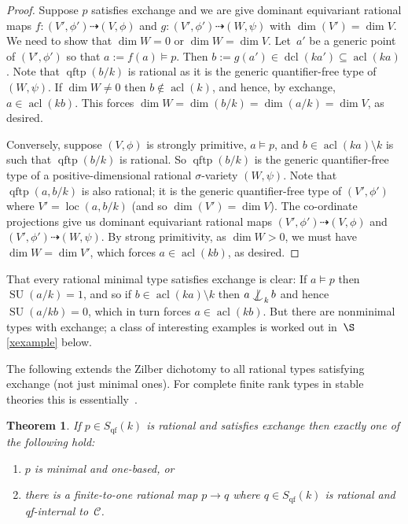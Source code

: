 \documentclass[\DocOpts]{amsart}
\newtheorem{theorem}{Theorem}[section]
\theoremstyle{definition}
\def\qftp{\operatorname{qftp}}
\def\qf{\operatorname{qf}}
\def\acl{\operatorname{acl}}
\def\dcl{\operatorname{dcl}}
\def\loc{\operatorname{loc}}
\def\su{\operatorname{SU}}
\def\C{\mathcal{C}}
\newcommand{\<}{\langle}
\renewcommand{\>}{\rangle}
\newcommand{\dto}{\dashrightarrow}
\def\notind#1#2{#1\setbox0=\hbox{\(#1x\)}\kern\wd0\hbox to 
0pt{\mathchardef\nn=12854\hss\(#1\nn\)\kern1.4\wd0\hss}\hbox to 
0pt{\hss\(#1\mid\)\hss}\lower.9\ht0 \hbox to 
0pt{\hss\(#1\smile\)\hss}\kern\wd0}
\def\nind{\mathop{\mathpalette\notind{}}}
\begin{document}
\begin{proof}
Suppose $p$ satisfies exchange and we are give dominant equivariant rational maps $f:(V',\phi')\dto (V,\phi)$ and $g:(V',\phi')\dto(W,\psi)$ with $\dim (V')=\dim V$.
We need to show that $\dim W=0$ or $\dim W=\dim V$.
Let~$a'$ be a generic point of $(V',\phi')$ so that $a:=f(a)\models p$.
Then $b:=g(a')\in\dcl(ka')\subseteq \acl(ka)$.
Note that $\qftp(b/k)$ is rational as it is the generic quantifier-free type of $(W,\psi)$.
If $\dim W\neq 0$ then $b\notin\acl(k)$, and hence, by exchange, $a\in\acl(kb)$.
This forces $\dim W=\dim(b/k)=\dim(a/k)=\dim V$, as desired.

Conversely, suppose $(V,\phi)$ is strongly primitive, $a\models p$, and $b\in\acl(ka)\setminus k$ is such that $\qftp(b/k)$ is rational.
So $\qftp(b/k)$ is the generic quantifier-free type of a positive-dimensional rational $\sigma$-variety $(W,\psi)$.
Note that $\qftp(a,b/k)$ is also rational; it is the generic quantifier-free type of $(V',\phi')$ where $V'=\loc(a,b/k)$ (and so $\dim(V')=\dim V$).
The co-ordinate projections give us dominant equivariant rational maps $(V',\phi')\dto (V,\phi)$ and $(V',\phi')\dto(W,\psi)$.
By strong primitivity, as $\dim W>0$, we must have $\dim W=\dim V'$, which forces $a\in\acl(kb)$, as desired.
\end{proof}

That every rational minimal type satisfies exchange is clear: If $a\models p$ then $\su(a/k)=1$, and so if $b\in\acl(ka)\setminus k$ then $a\nind_kb$ and hence $\su(a/kb)=0$, which in turn forces $a\in\acl(kb)$.
But there are nonminimal types with exchange; a class of interesting examples is worked out in~$\S$\ref{xexample} below.

The following extends the Zilber dichotomy to all rational types satisfying exchange (not just minimal ones).
For complete finite rank types in stable theories this is essentially~\cite[Proposition~2.3]{moosa-pillay2014}.

\begin{theorem}
\label{thm:nonorth}
If $p\in S_{\qf}(k)$ is rational and satisfies exchange then exactly one of the following hold:
\begin{enumerate}
\item
$p$ is minimal and one-based, or
\item
there is a finite-to-one 
rational map $p\to q$ where $q\in S_{\qf}(k)$ is rational and qf-internal to~$\C$.
\end{enumerate}
\end{theorem}
\end{document}
